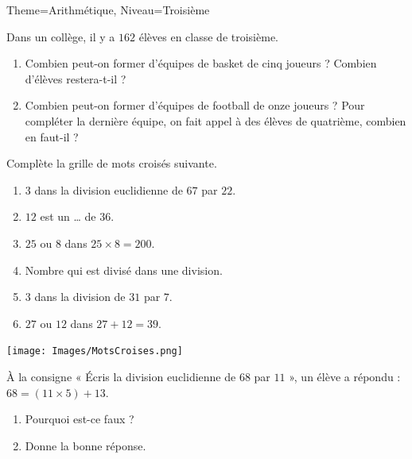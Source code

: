 \documentclass[11pt]{article}
\begin{document}
\begin{multicols}{2}

    \begin{Maquette}[Fiche]{Theme=Arithmétique, Niveau=Troisième}

        \begin{exercice}
            Dans un collège, il y a $162$ élèves en classe de troisième.
            \begin{enumerate}
                \item Combien peut-on former d’équipes de basket de cinq joueurs ? Combien d’élèves restera-t-il ?
                \item Combien peut-on former d’équipes de football de onze joueurs ? Pour compléter la dernière équipe, on fait appel à des élèves de quatrième, combien en faut-il ?
            \end{enumerate}
        \end{exercice}

        \begin{exercice}
            Complète la grille de mots croisés suivante.
            \begin{enumerate}
                \item $3$ dans la division euclidienne de $67$ par $22$.
                \item $12$ est un … de $36$.
                \item $25$ ou $8$ dans $25 \times 8 = 200$.
                \item Nombre qui est divisé dans une division.
                \item $3$ dans la division de $31$ par $7$.
                \item $27$ ou $12$ dans $27 + 12 = 39$.
            \end{enumerate}
            \texttt{[image: Images/MotsCroises.png]}

        \end{exercice}

        \begin{exercice}
            À la consigne « Écris la division euclidienne de $68$ par $11$ », un élève a répondu : $68 = (11 \times 5) + 13$.
            \begin{enumerate}
                \item Pourquoi est-ce faux ?
                \item Donne la bonne réponse.
            \end{enumerate}
        \end{exercice}


\end{Maquette}
\end{multicols}
\end{document}
